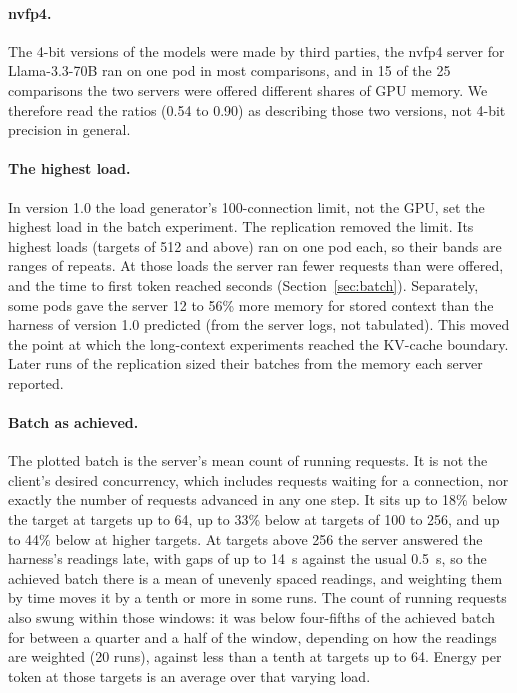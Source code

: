 \documentclass[11pt]{article}
\begin{document}
\paragraph{nvfp4.} The 4-bit versions of the models were made by third parties, the nvfp4 server for Llama-3.3-70B ran on one pod in most comparisons, and in 15 of the 25 comparisons the two servers were offered different shares of GPU memory. We therefore read the ratios (0.54 to 0.90) as describing those two versions, not 4-bit precision in general.

\paragraph{The highest load.} In version 1.0 the load generator's 100-connection limit, not the GPU, set the highest load in the batch experiment. The replication removed the limit. Its highest loads (targets of 512 and above) ran on one pod each, so their bands are ranges of repeats. At those loads the server ran fewer requests than were offered, and the time to first token reached seconds (Section~\ref{sec:batch}). Separately, some pods gave the server 12 to 56\% more memory for stored context than the harness of version 1.0 predicted (from the server logs, not tabulated). This moved the point at which the long-context experiments reached the KV-cache boundary. Later runs of the replication sized their batches from the memory each server reported.

\paragraph{Batch as achieved.} The plotted batch is the server's mean count of running requests. It is not the client's desired concurrency, which includes requests waiting for a connection, nor exactly the number of requests advanced in any one step. It sits up to 18\% below the target at targets up to 64, up to 33\% below at targets of 100 to 256, and up to 44\% below at higher targets. At targets above 256 the server answered the harness's readings late, with gaps of up to 14~s against the usual 0.5~s, so the achieved batch there is a mean of unevenly spaced readings, and weighting them by time moves it by a tenth or more in some runs. The count of running requests also swung within those windows: it was below four-fifths of the achieved batch for between a quarter and a half of the window, depending on how the readings are weighted (20 runs), against less than a tenth at targets up to 64. Energy per token at those targets is an average over that varying load.
\end{document}
